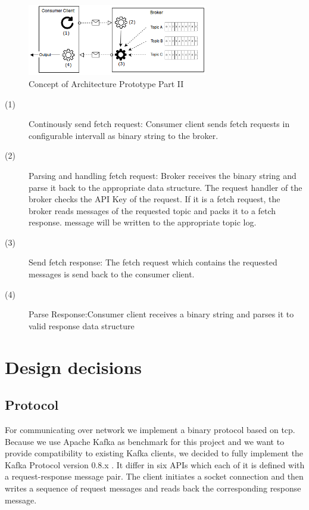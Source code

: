 \begin{figure}[H]
    \centering
   \includegraphics[width=0.7\textwidth]{images/concept_consumer.png}
    \caption{Concept of Architecture Prototype Part II}
    \label{fig:concept-consumer}
\end{figure}

\begin{description}
    \item [(1)] 
        {Continously send fetch request: Consumer client sends fetch
        requests in configurable intervall as binary string to the broker. } 
    \item [(2)] 
        {Parsing and handling fetch request: Broker receives the binary string
            and parse it back to the appropriate data structure. The request
            handler of the broker checks the API Key of the request. If it is a
            fetch request, the broker reads messages of the requested topic and
            packs it to a fetch response. message will be written to the
            appropriate topic log.}
    \item [(3)] 
        {Send fetch response: The fetch request which contains the requested
        messages is send back to the consumer client.}
    \item [(4)] 
        {Parse Response:Consumer client receives a binary string and parses it
        to valid response data structure }
\end{description}

\section{Design decisions}
\subsection{Protocol}
For communicating over network we implement a binary protocol based on tcp.
Because we use Apache Kafka as benchmark for this project and we want to provide
compatibility to existing Kafka clients, we decided to fully implement the Kafka
Protocol version 0.8.x . It differ in six APIs which each of it is
defined with a request-response message pair. The client initiates a socket connection and then
writes a sequence of request messages and reads back the corresponding response
message. 

